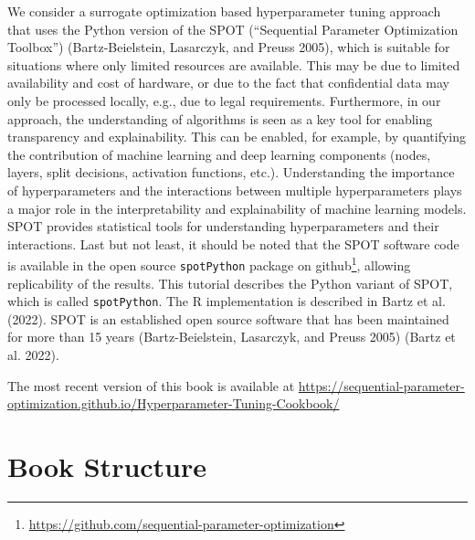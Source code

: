 \documentclass[
  letterpaper,
  DIV=11,
  numbers=noendperiod]{scrreprt}
\begin{document}
We consider a surrogate optimization based hyperparameter tuning
approach that uses the Python version of the SPOT (``Sequential
Parameter Optimization Toolbox'') (Bartz-Beielstein, Lasarczyk, and
Preuss 2005), which is suitable for situations where only limited
resources are available. This may be due to limited availability and
cost of hardware, or due to the fact that confidential data may only be
processed locally, e.g., due to legal requirements. Furthermore, in our
approach, the understanding of algorithms is seen as a key tool for
enabling transparency and explainability. This can be enabled, for
example, by quantifying the contribution of machine learning and deep
learning components (nodes, layers, split decisions, activation
functions, etc.). Understanding the importance of hyperparameters and
the interactions between multiple hyperparameters plays a major role in
the interpretability and explainability of machine learning models. SPOT
provides statistical tools for understanding hyperparameters and their
interactions. Last but not least, it should be noted that the SPOT
software code is available in the open source \texttt{spotPython}
package on github\footnote{\url{https://github.com/sequential-parameter-optimization}},
allowing replicability of the results. This tutorial describes the
Python variant of SPOT, which is called \texttt{spotPython}. The R
implementation is described in Bartz et al. (2022). SPOT is an
established open source software that has been maintained for more than
15 years (Bartz-Beielstein, Lasarczyk, and Preuss 2005) (Bartz et al.
2022).

\begin{tcolorbox}[enhanced jigsaw, left=2mm, title=\textcolor{quarto-callout-important-color}{\faExclamation}\hspace{0.5em}{Important: This book is still under development.}, bottomrule=.15mm, titlerule=0mm, breakable, rightrule=.15mm, toprule=.15mm, coltitle=black, colbacktitle=quarto-callout-important-color!10!white, leftrule=.75mm, arc=.35mm, colframe=quarto-callout-important-color-frame, bottomtitle=1mm, colback=white, opacitybacktitle=0.6, toptitle=1mm, opacityback=0]

The most recent version of this book is available at
\url{https://sequential-parameter-optimization.github.io/Hyperparameter-Tuning-Cookbook/}

\end{tcolorbox}

\hypertarget{book-structure}{%
\section*{Book Structure}\label{book-structure}}
\end{document}
